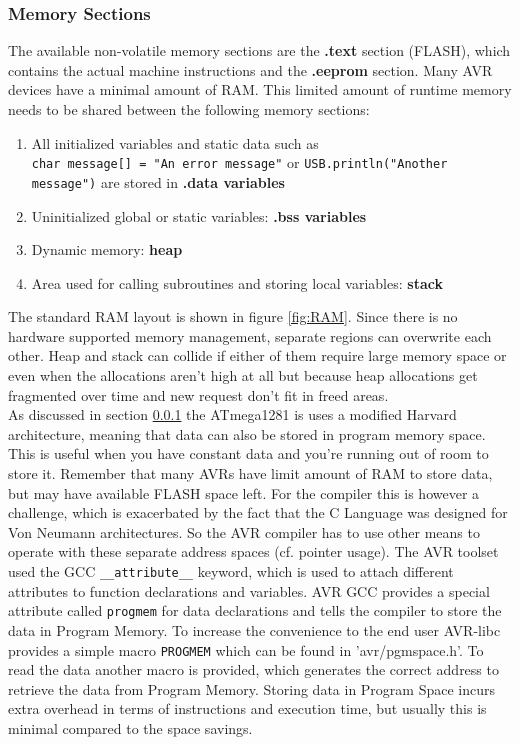 \subsubsection{Memory Sections}
\label{memory}
The available non-volatile memory sections are the \textbf{.text} section (FLASH), which contains the actual machine instructions and the \textbf{.eeprom} section. Many AVR devices have a minimal amount of RAM. This limited amount of runtime memory needs to be shared between the following memory sections:
\begin{enumerate}
\item All initialized variables and static data such as\\ \verb+char message[] = "An error message"+ or \verb+USB.println("Another message")+ are stored in \textbf{.data variables}
\item Uninitialized global or static variables: \textbf{.bss variables}
\item Dynamic memory: \textbf{heap}
\item Area used for calling subroutines and storing local variables: \textbf{stack}
\end{enumerate}
The standard RAM layout is shown in figure \ref{fig:RAM}. Since there is no hardware supported memory management, separate regions can overwrite each other. Heap and stack can collide if either of them require large memory space or even when the allocations aren't high at all but because heap allocations get fragmented over time and new request don't fit in freed areas.\\ %
As discussed in section \ref{memory} the ATmega1281 is uses a modified Harvard architecture, meaning that data can also be stored in program memory space. This is useful when you have constant data and you're running out of room to store it. Remember that many AVRs have limit amount of RAM to store data, but may have available FLASH space left. For the compiler this is however a challenge, which is exacerbated by the fact that the C Language was designed for Von Neumann architectures. So the AVR compiler has to use other means to operate with these separate address spaces (cf. pointer usage). The AVR toolset used the GCC \verb+__attribute__+ keyword, which is used to attach different attributes to function declarations and variables. AVR GCC provides a special attribute called \verb+progmem+ for data declarations and tells the compiler to store the data in Program Memory. To increase the convenience to the end user AVR-libc provides a simple macro \verb+PROGMEM+ which can be found in 'avr/pgmspace.h'. To read the data another macro is provided, which generates the correct address to retrieve the data from Program Memory. Storing data in Program Space incurs extra overhead in terms of instructions and execution time, but usually this is minimal compared to the space savings.\\
